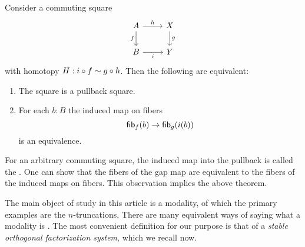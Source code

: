 \documentclass[9pt,twosided]{amsart}
\begin{document}
\begin{thm}
  Consider a commuting square
  \begin{equation*}
    \begin{tikzcd}
      A \arrow[r,"h"] \arrow[d,swap,"f"] & X \arrow[d,"g"] \\
      B \arrow[r,swap,"i"] & Y
    \end{tikzcd}
  \end{equation*}
  with homotopy $H:i\circ f\sim g\circ h$. Then the following are equivalent:
  \begin{enumerate}
  \item The square is a pullback square.
  \item For each $b:B$ the induced map on fibers
    \begin{equation*}
      \fib{f}{b} \to \fib{g}{i(b)}
    \end{equation*}
    is an equivalence.
  \end{enumerate}
\end{thm}

For an arbitrary commuting square, the induced map into the pullback is called the . One can show that the fibers of the gap map are equivalent to the fibers of the induced maps on fibers. This observation implies the above theorem.

The main object of study in this article is a modality, of which the primary examples are the $n$-truncations. There are many equivalent ways of saying what a modality is \cite{RijkeSpittersShulman}. The most convenient definition for our purpose is that of a \emph{stable orthogonal factorization system}, which we recall now.
\end{document}
